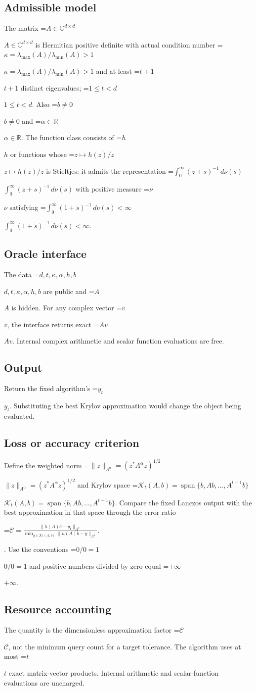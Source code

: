 \documentclass[10pt,a4paper]{article}
\newcommand{\AtlasMath}[1]{\par\begingroup\centering\setbox0=\hbox{$\displaystyle #1$}\ifdim\wd0>1.4\linewidth\typeout{ATLAS WIDE FORMULA: \the\wd0}\fi\ifdim\wd0>\linewidth\resizebox{\linewidth}{!}{\box0}\else\box0\fi\par\endgroup}
\newcommand{\AtlasInlineMath}[1]{\begingroup\setbox0=\hbox{$#1$}\ifdim\wd0>.4\linewidth\endgroup\AtlasMath{#1}\else\endgroup$#1$\fi}
\begin{document}
\subsection{Admissible model}
The matrix \AtlasInlineMath{A\in\mathbb{C}^{d\times d}} is Hermitian positive definite with actual condition number \AtlasInlineMath{\kappa=\lambda_{\max}(A)/\lambda_{\min}(A)>1} and at least \AtlasInlineMath{t+1} distinct eigenvalues; \AtlasInlineMath{1\le t<d}. Also \AtlasInlineMath{b\ne0} and \AtlasInlineMath{\alpha\in\mathbb{R}}. The function class consists of \AtlasInlineMath{h} or functions whose \AtlasInlineMath{z\mapsto h(z)/z} is Stieltjes: it admits the representation \AtlasInlineMath{\int_0^\infty(z+s)^{-1}\,d\nu(s)} with positive measure \AtlasInlineMath{\nu} satisfying \AtlasInlineMath{\int_0^\infty(1+s)^{-1}\,d\nu(s)<\infty}.

\subsection{Oracle interface}
The data \AtlasInlineMath{d,t,\kappa,\alpha,h,b} are public and \AtlasInlineMath{A} is hidden. For any complex vector \AtlasInlineMath{v}, the interface returns exact \AtlasInlineMath{Av}. Internal complex arithmetic and scalar function evaluations are free.

\subsection{Output}
Return the fixed algorithm's \AtlasInlineMath{y_t}. Substituting the best Krylov approximation would change the object being evaluated.

\subsection{Loss or accuracy criterion}
Define the weighted norm \AtlasInlineMath{\|z\|_{A^\alpha}=(z^*A^\alpha z)^{1/2}} and Krylov space \AtlasInlineMath{\mathcal{K}_t(A,b)=\operatorname{span}\{b,Ab,\ldots,A^{t-1}b\}}. Compare the fixed Lanczos output with the best approximation in that space through the error ratio 
\AtlasMath{\mathcal{C}=\frac{\|h(A)b-y_t\|_{A^\alpha}}{\min_{y\in\mathcal{K}_t(A,b)}\|h(A)b-y\|_{A^\alpha}}.}
. Use the conventions \AtlasInlineMath{0/0=1} and positive numbers divided by zero equal \AtlasInlineMath{+\infty}.

\subsection{Resource accounting}
The quantity is the dimensionless approximation factor \AtlasInlineMath{\mathcal{C}}, not the minimum query count for a target tolerance. The algorithm uses at most \AtlasInlineMath{t} exact matrix-vector products. Internal arithmetic and scalar-function evaluations are uncharged.
\end{document}
